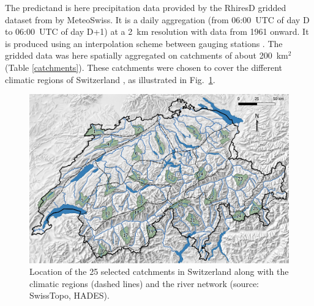 \documentclass[draft]{agujournal2019}
\begin{document}
The predictand is here precipitation data provided by the RhiresD gridded dataset from by MeteoSwiss. It is a daily aggregation (from 06:00~UTC of day D to 06:00~UTC of day D+1) at a 2~km resolution with data from 1961 onward. It is produced using an interpolation scheme between gauging stations \cite{Frei1998}. The gridded data was here spatially aggregated on catchments of about 200~km$^2$ (Table \ref{catchments}). These catchments were chosen to cover the different climatic regions of Switzerland \cite{Schuepp1980}, as illustrated in Fig.~\ref{map}.


\begin{figure}[hbt]
	\noindent\includegraphics[width=140mm]{figures/map.jpg}
	\caption{Location of the 25 selected catchments in Switzerland along with the climatic regions (dashed lines) and the river network (source: SwissTopo, HADES).}
	\label{map}
\end{figure}
\end{document}
